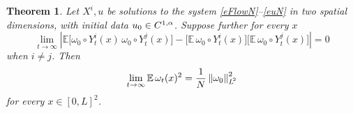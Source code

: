 \documentclass[final]{amsart}%
\newcommand{\mceuler}{\eqref{eFlowN}--\eqref{euN}\xspace}
\newcommand{\E}{\mathbb{E}}
\newcommand{\holderspace}[2]{\ensuremath{C^{\ifx0#1{#2}\else{#1,#2}\fi}}}
\newif\iftextstyle
\newcommand{\abs}[1]{\iftextstyle\lvert#1\rvert\else\left\lvert#1\right\rvert\fi}
\newcommand{\norm}[1]{\iftextstyle\lVert#1\rVert\else\left\lVert#1\right\rVert\fi}
\newcommand{\lpnorm}[2]{\norm{#1}_{\smash{L^{\!#2}_{\vphantom{h}}}\vphantom{L^{\!#2}}}}
\numberwithin{equation}{section}
\newtheorem{theorem}{Theorem}[section]
\theoremstyle{definition}
\theoremstyle{remark}
\begin{document}
\iffalse%
\begin{theorem}\label{tPointwiseLimit}%
  Let $X^i, u$ be solutions to the system \mceuler in two spatial
  dimensions, with initial data $u_0 \in
  \holderspace{1}{\alpha}$. Suppose further for every $x$
\begin{equation}\label{eLongTimeDecorrelation}
  \lim_{t \to \infty} \abs{\E\big[ \omega_0 \circ Y^i_t(x) \, \omega_0 \circ
    Y^j_t(x)\big] - \big[\E\,\omega_0 \circ Y^i_t(x)\big] \big[\E\, \omega_0 \circ Y^j_t(x)\big]} = 0 
\end{equation}
when $i \neq j$. Then
\begin{equation}\label{eLongTimeOmega}
\lim_{t \to \infty} \E\,\omega_t(x)^2 = \frac{1}{N} \lpnorm{\omega_0}{2}^2
\end{equation}
for every $x \in [0,L]^2$.
\end{theorem}%
\end{document}
